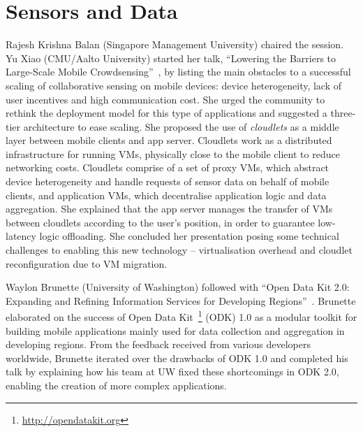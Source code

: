 \section{Sensors and Data}
\label{sec:sensors}

Rajesh Krishna Balan (Singapore Management University) chaired the
session. Yu Xiao (CMU/Aalto University) started her talk, ``Lowering the
Barriers to Large-Scale Mobile Crowdsensing''~\cite{xiao13}, by listing
the main
obstacles to a successful scaling of collaborative sensing on mobile devices:
device heterogeneity, lack of user incentives and high communication
cost. She urged the community to rethink the deployment model for this
type of applications and suggested a three-tier architecture to ease
scaling. She proposed the use of \emph{cloudlets} as a middle layer between
mobile clients and app server. Cloudlets work as a
distributed infrastructure for running VMs, physically close to the
mobile client to reduce networking costs. Cloudlets comprise of a set of
proxy VMs, which abstract device heterogeneity and handle requests of
sensor data on behalf of mobile clients, and application VMs, which
decentralise application logic and data aggregation. She explained that
the app server manages the transfer of VMs between cloudlets according
to the user's position, in order to guarantee low-latency logic
offloading. She concluded her presentation posing some technical
challenges to enabling this new technology -- virtualisation overhead and
cloudlet reconfiguration due to VM migration.

Waylon Brunette (University of Washington) followed with ``Open Data Kit
2.0: Expanding and Refining Information Services for Developing
Regions''~\cite{brunette13}. Brunette elaborated on the success of
Open Data
Kit~\footnote{\url{http://opendatakit.org}} (ODK) 1.0 as a modular
toolkit for building mobile applications mainly used for data collection
and aggregation in developing regions. From the feedback received from
various developers worldwide, Brunette iterated over the drawbacks of
ODK 1.0 and completed his talk by explaining how his team at UW fixed
these shortcomings in ODK 2.0, enabling the creation of more complex
applications.


